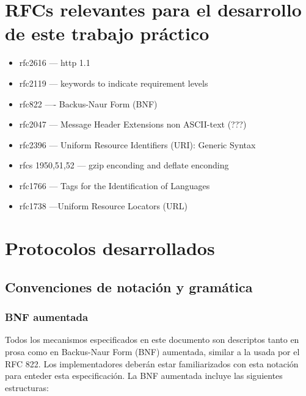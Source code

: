 \documentclass[a4paper,10pt]{article}
\begin{document}
\setcounter{page}{1}

\tableofcontents

\newpage
\section{RFCs relevantes para el desarrollo de este trabajo pr\'actico}

\begin{itemize}
 \item rfc2616 --- http 1.1
 \item rfc2119 --- keywords to indicate requirement levels
 \item rfc822 ---- Backus-Naur Form (BNF)
 \item rfc2047 --- Message Header Extensions non ASCII-text (???)
 \item rfc2396 --- Uniform Resource Identifiers (URI): Generic Syntax

 \item rfcs 1950,51,52 --- gzip enconding and deflate enconding
 \item rfc1766 --- Tags for the Identification of Languages
 \item rfc1738 ---Uniform Resource Locators (URL)
\end{itemize}


\newpage
\section{Protocolos desarrollados}

    \subsection{Convenciones de notaci\'on y gram\'atica}

        \subsubsection{BNF aumentada}

        Todos los mecanismos especificados en este documento son descriptos tanto en prosa como en Backus-Naur Form (BNF) aumentada, similar a la usada por el RFC 822.
        \label{RFC 822}
        Los implementadores deber\'an estar familiarizados con esta notaci\'on para enteder esta especificaci\'on. La BNF aumentada incluye las siguientes estructuras:
\end{document}
